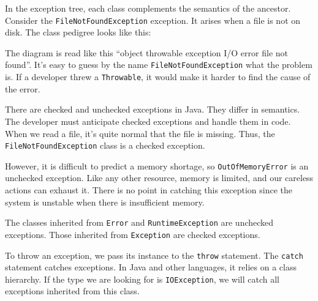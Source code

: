 In the exception tree, each class complements the semantics of the ancestor. Consider the \verb|FileNotFoundException| exception. It arises when a file is not on disk. The class pedigree looks like this:

\linegap

\ifnarrow


\else


\fi

\linegap

The diagram is read like this ``object \arr throwable \arr exception \arr I/O error \arr file not found''. It's easy to guess by the name \verb|FileNotFoundException| what the problem is. If a developer threw a \verb|Throwable|, it would make it harder to find the cause of the error.

There are checked and unchecked exceptions in Java. They differ in semantics. The developer must anticipate checked exceptions and handle them in code. When we read a file, it's quite normal that the file is missing. Thus, the \verb|FileNotFoundException| class is a checked exception.


\label{exc-hierarchy}

However, it is difficult to predict a memory shortage, so \verb|OutOfMemoryError| is an unchecked exception. Like any other resource, memory is limited, and our careless actions can exhaust it. There is no point in catching this exception since the system is unstable when there is insufficient memory.


The classes inherited from \verb|Error| and \texttt{Runtime\-Exception} are unchecked exceptions. Those inherited from \verb|Exception| are checked exceptions.


To throw an exception, we pass its instance to the \verb|throw| statement. The \verb|catch| statement catches exceptions. In Java and other languages, it relies on a class hierarchy. If the type we are looking for is \verb|IOException|, we will catch all exceptions inherited from this class.

